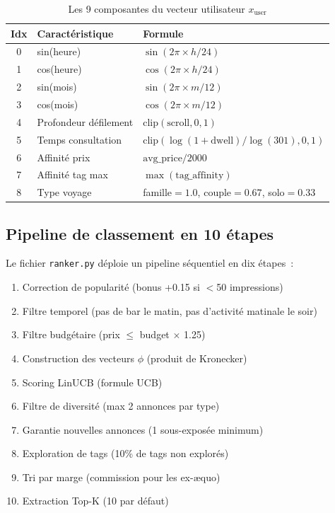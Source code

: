 \begin{table}[H]
    \centering
    \caption{Les 9 composantes du vecteur utilisateur $x_{\text{user}}$}
    \label{tab:user_vector}
    \small
    \begin{tabular}{c l l}
        \toprule
        \textbf{Idx} & \textbf{Caractéristique} & \textbf{Formule} \\
        \midrule
        0 & sin(heure) & $\sin(2\pi \times h / 24)$ \\
        1 & cos(heure) & $\cos(2\pi \times h / 24)$ \\
        2 & sin(mois) & $\sin(2\pi \times m / 12)$ \\
        3 & cos(mois) & $\cos(2\pi \times m / 12)$ \\
        4 & Profondeur défilement & $\text{clip}(\text{scroll}, 0, 1)$ \\
        5 & Temps consultation & $\text{clip}(\log(1+\text{dwell})/\log(301), 0, 1)$ \\
        6 & Affinité prix & $\text{avg\_price} / 2000$ \\
        7 & Affinité tag max & $\max(\text{tag\_affinity})$ \\
        8 & Type voyage & famille$=1.0$, couple$=0.67$, solo$=0.33$ \\
        \bottomrule
    \end{tabular}
\end{table}

\subsection{Pipeline de classement en 10 étapes}

Le fichier \texttt{ranker.py} déploie un pipeline séquentiel en dix étapes~:
\begin{enumerate}
    \item Correction de popularité (bonus +0.15 si $<$50 impressions)
    \item Filtre temporel (pas de bar le matin, pas d'activité matinale le soir)
    \item Filtre budgétaire (prix $\leq$ budget $\times$ 1.25)
    \item Construction des vecteurs $\phi$ (produit de Kronecker)
    \item Scoring LinUCB (formule UCB)
    \item Filtre de diversité (max 2 annonces par type)
    \item Garantie nouvelles annonces (1 sous-exposée minimum)
    \item Exploration de tags (10\% de tags non explorés)
    \item Tri par marge (commission pour les ex-æquo)
    \item Extraction Top-K (10 par défaut)
\end{enumerate}

